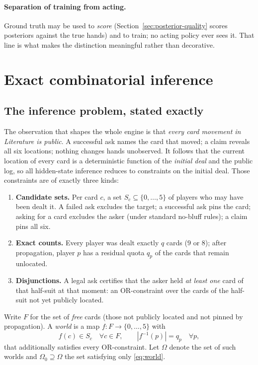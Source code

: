 \documentclass[11pt,letterpaper]{article}
\begin{document}
\paragraph{Separation of training from acting.} Ground truth may be used to
\emph{score} (Section~\ref{sec:posterior-quality} scores posteriors against the
true hands) and to train; no acting policy ever sees it. That line is what
makes the distinction meaningful rather than decorative.

\section{Exact combinatorial inference}
\label{sec:counting}

\subsection{The inference problem, stated exactly}

The observation that shapes the whole engine is that \emph{every card movement
in Literature is public}. A successful ask names the card that moved; a claim
reveals all six locations; nothing changes hands unobserved. It follows that
the current location of every card is a deterministic function of the
\emph{initial deal} and the public log, so all hidden-state inference reduces
to constraints on the initial deal. Those constraints are of exactly three
kinds:

\begin{enumerate}
\item \textbf{Candidate sets.} Per card $c$, a set $S_c \subseteq \{0,\dots,5\}$
of players who may have been dealt it. A failed ask excludes the target;
a successful ask pins the card; asking for a card excludes the asker (under
standard no-bluff rules); a claim pins all six.
\item \textbf{Exact counts.} Every player was dealt exactly $q$ cards ($9$ or
$8$); after propagation, player $p$ has a residual quota $q_p$ of the cards
that remain unlocated.
\item \textbf{Disjunctions.} A legal ask certifies that the asker held
\emph{at least one} card of that half-suit at that moment: an OR-constraint
over the cards of the half-suit not yet publicly located.
\end{enumerate}

Write $F$ for the set of \emph{free} cards (those not publicly located and not
pinned by propagation). A \emph{world} is a map $f : F \to \{0,\dots,5\}$ with
\begin{equation}
f(c) \in S_c \quad \forall c \in F,
\qquad
|f^{-1}(p)| = q_p \quad \forall p,
\label{eq:world}
\end{equation}
that additionally satisfies every OR-constraint. Let $\Omega$ denote the set of
such worlds and $\Omega_0 \supseteq \Omega$ the set satisfying only
\eqref{eq:world}.
\end{document}
